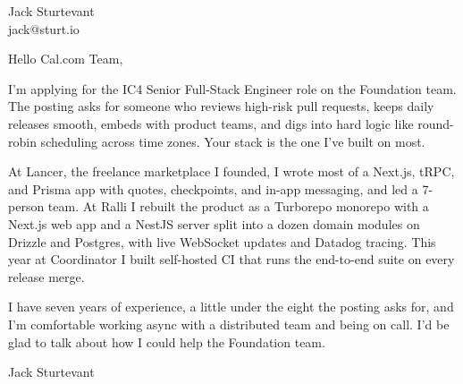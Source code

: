 \documentclass[11pt]{article}
\begin{document}
\raggedright

{\namefont\fontsize{20pt}{24pt}\selectfont Jack Sturtevant}\\[-0.3em]
jack@sturt.io

\vspace{1.2em}

Hello Cal.com Team,

I'm applying for the IC4 Senior Full-Stack Engineer role on the Foundation team. The posting asks for someone who reviews high-risk pull requests, keeps daily releases smooth, embeds with product teams, and digs into hard logic like round-robin scheduling across time zones. Your stack is the one I've built on most.

At Lancer, the freelance marketplace I founded, I wrote most of a Next.js, tRPC, and Prisma app with quotes, checkpoints, and in-app messaging, and led a 7-person team. At Ralli I rebuilt the product as a Turborepo monorepo with a Next.js web app and a NestJS server split into a dozen domain modules on Drizzle and Postgres, with live WebSocket updates and Datadog tracing. This year at Coordinator I built self-hosted CI that runs the end-to-end suite on every release merge.

I have seven years of experience, a little under the eight the posting asks for, and I'm comfortable working async with a distributed team and being on call. I'd be glad to talk about how I could help the Foundation team.

\vspace{0.6em}
Jack Sturtevant
\end{document}
